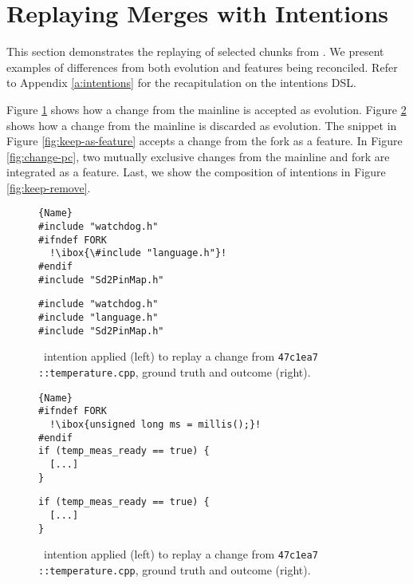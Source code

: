 \section{Replaying Merges with Intentions}
This section demonstrates the replaying of selected chunks from \marlin. We present examples of differences from both evolution and features being reconciled. Refer to Appendix \ref{a:intentions} for the recapitulation on the intentions DSL.

Figure \ref{fig:ex-keep} shows how a change from the mainline is accepted as evolution. Figure \ref{fig:ex-remove} shows how a change from the mainline is discarded as evolution. The snippet in Figure \ref{fig:keep-as-feature} accepts a change from the fork as a feature. In Figure \ref{fig:change-pc}, two mutually exclusive changes from the mainline and fork are integrated as a feature. Last, we show the composition of intentions in Figure \ref{fig:keep-remove}.

\begin{figure}[ht]
    \centering
    \begin{minipage}{.35\textwidth}
\begin{lstlisting}[caption=Wrapped code by PC,escapechar=!]{Name}
#include "watchdog.h"
#ifndef FORK
  !\ibox{\#include "language.h"}!
#endif
#include "Sd2PinMap.h"
\end{lstlisting}
\end{minipage}\qquad
\begin{minipage}{.35\textwidth}
\begin{lstlisting}
#include "watchdog.h"
#include "language.h"
#include "Sd2PinMap.h"
\end{lstlisting}

    \end{minipage}
    \caption{\keep~intention applied (left) to replay a change from \texttt{47c1ea7 ::temperature.cpp}, ground truth and outcome (right).}
    \label{fig:ex-keep}
\end{figure}

\begin{figure}[ht]
    \centering
    \begin{minipage}{.45\textwidth}
\begin{lstlisting}[caption=Wrapped code by PC,escapechar=!]{Name}
#ifndef FORK
  !\ibox{unsigned long ms = millis();}!
#endif
if (temp_meas_ready == true) {
  [...]
}
\end{lstlisting}
\end{minipage}\qquad
\begin{minipage}{.45\textwidth}
\begin{lstlisting}
if (temp_meas_ready == true) {
  [...]
}
\end{lstlisting}

    \end{minipage}
    \caption{\remove~intention applied (left) to replay a change from \texttt{47c1ea7 ::temperature.cpp}, ground truth and outcome (right).}
    \label{fig:ex-remove}
\end{figure}


